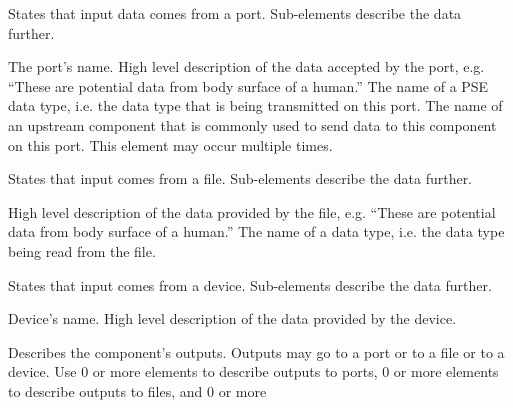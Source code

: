 \documentclass[11pt]{article}
\begin{document}
\begin{description}
\begin{description}
\begin{description}
      \begin{description}
         States that input data comes from a port. 
        Sub-elements describe the data further.
        \begin{description}
           The port's name.
           High level description of the data 
          accepted by the port, e.g. ``These are potential data from body 
          surface of a human.''
           The name of a PSE data type, i.e. the 
          data type that is being transmitted on this port.
           The name of an upstream component
          that is commonly used to send data to this component on this
          port.  This element may occur multiple times. 
        \end{description}
         States that input comes from a file.
        Sub-elements describe the data further.
        \begin{description}
           High level description of the data 
          provided by the file, e.g. ``These are potential data from body 
          surface of a human.''
           The name of a \sr{} data type, i.e. the 
          data type being read from the file.  
        \end{description}
         States that input comes from a device.
        Sub-elements describe the data further.
        \begin{description}
           Device's name.
           High level description of the data 
          provided by the device.
        \end{description}
      \end{description}
       Describes the component's outputs.  Outputs may
      go to a port or to a file or to a device.  Use 0 or more
       elements to describe outputs to ports, 0 or more
       elements to describe outputs to files, and 0 or more

\end{description}
\end{description}
\end{description}
\end{document}
